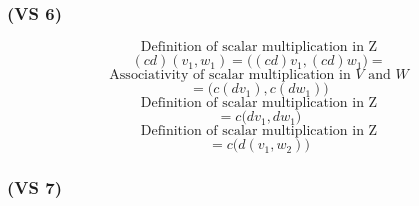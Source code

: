 \documentclass{article}
\begin{document}
\subsubsection*{(VS 6)}

\begin{equation*}
    \text{Definition of scalar multiplication in Z}
\end{equation*}
\begin{equation*}
    (cd)(v_{1}, w_{1}) = \Big((cd)v_{1}, (cd)w_{1}\Big) =
\end{equation*}
\begin{equation*}
    \text{Associativity of scalar multiplication in \(V\) and \(W\)}
\end{equation*}
\begin{equation*}
    = \Big(c(dv_{1}), c(dw_{1})\Big) 
\end{equation*}
\begin{equation*}
    \text{Definition of scalar multiplication in Z}
\end{equation*}
\begin{equation*}
    = c\Big(dv_{1}, dw_{1}\Big) 
\end{equation*}
\begin{equation*}
    \text{Definition of scalar multiplication in Z}
\end{equation*}
\begin{equation*}
    = c\Big(d(v_{1}, w_{2})\Big)
\end{equation*}

\subsubsection*{(VS 7)}
\end{document}
